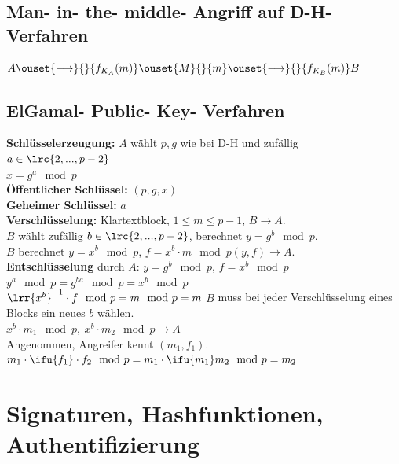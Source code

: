   \subsection{Man- in- the- middle- Angriff auf D-H- Verfahren}

  $A\ouset{\longrightarrow}{}{f_{K_A}(m)}\ouset{M}{}{m}
  \ouset{\longrightarrow}{}{f_{K_B}(m)} B$

  \subsection{ElGamal- Public- Key- Verfahren}
    \textbf{Schlüsselerzeugung:} $A$ wählt $p,g$ wie bei D-H und zufällig
    $a\in\lrc{2,...,p-2}$\\
    $x=g^a\mod p$\\
    \textbf{Öffentlicher Schlüssel:} $(p,g,x)$\\
    \textbf{Geheimer Schlüssel:} $a$\\
    \textbf{Verschlüsselung:} Klartextblock, $1\leq m\leq p-1$, $B\rightarrow A$.\\
    $B$ wählt zufällig $b\in\lrc{2,...,p-2}$, berechnet $y=g^b\mod p$.\\
    $B$ berechnet $y=x^b\mod p$, $f=x^b\cdot m\mod p$\quad $(y,f)\rightarrow
    A$.\\
    \textbf{Entschlüsselung} durch $A$: $y=g^b\mod p$, $f=x^b\mod p$\\
    $y^a\mod p=g^{ba}\mod p=x^b\mod p$\\
    $\lrr{x^b}^{-1}\cdot f\mod p=m\mod p=m$
    $B$ muss bei jeder Verschlüsselung eines Blocks ein neues $b$ wählen.\\
    $x^b\cdot m_1\mod p,\ x^b\cdot m_2\mod p\longrightarrow A$\\
    Angenommen, Angreifer kennt $(m_1,f_1)$. $m_1\cdot\ifu{f_1}\cdot f_2\mod p
    =m_1\cdot\ifu{m_1}m_2\mod p=m_2$

\section{Signaturen, Hashfunktionen, Authentifizierung}

